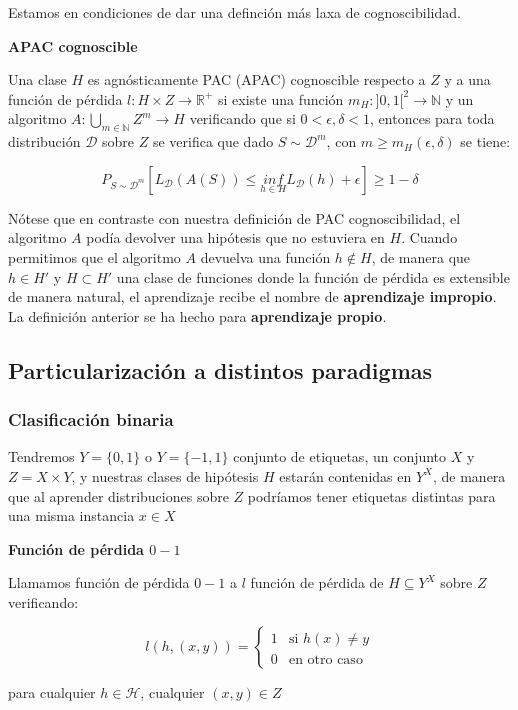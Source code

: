 Estamos en condiciones de dar una definción más laxa de cognoscibilidad.

\begin{definition} \textbf{APAC cognoscible}

Una clase $H$ es agnósticamente PAC (APAC) cognoscible respecto a $Z$ y a una función de pérdida 
$l: H \times Z \rightarrow \mathbb{R}^{+}$ si existe una función 
$m_{H} : ]0,1[^2\rightarrow \mathbb{N}$ y un algoritmo 
$A: \underset{m\in \mathbb{N}}{\bigcup} Z^m \rightarrow H$ verificando que si 
$0 < \epsilon, \delta < 1$, entonces para toda distribución $\mathcal{D}$ sobre $Z$ se verifica
que dado $S\sim \mathcal{D}^m$, con $m\ge m_{H}(\epsilon, \delta)$ se tiene:

\[P_{S\sim \mathcal{D}^m}[L_{\mathcal{D}}(A(S)) \le \underset{h\in H}{inf} L_{\mathcal{D}}(h) + \epsilon] \ge 1-\delta\]
\end{definition}

Nótese que en contraste con nuestra definición de PAC cognoscibilidad, el algoritmo $A$ podía devolver una 
hipótesis que no estuviera en $H$. Cuando permitimos que el algoritmo $A$ devuelva una función 
$h \notin H$, de manera que $h \in H'$ y  $H \subset H'$ una clase de funciones donde la función de pérdida 
es extensible de manera natural, el aprendizaje recibe el nombre de \textbf{aprendizaje impropio}. La definición 
anterior se ha hecho para \textbf{aprendizaje propio}.


\subsection{Particularización a distintos paradigmas}

\subsubsection{Clasificación binaria}

Tendremos $Y=\{0,1\}$ o $Y=\{-1,1\}$ conjunto de etiquetas, un conjunto $X$ y $Z=X\times Y$, y nuestras clases
de hipótesis $H$ estarán contenidas en $Y^X$, de manera que al aprender distribuciones sobre $Z$ podríamos 
tener etiquetas distintas para una misma instancia $x \in X$

\begin{definition} \textbf{Función de pérdida $0-1$}

Llamamos función de pérdida $0-1$ a $l$ función de pérdida de $H\subseteq Y^X$ sobre $Z$ verificando:
 
 \[l(h, (x,y)) = \left\{\begin{array}{ll}
                         1 & \textrm{si } h(x)\neq y\\
                         0 & \textrm{en otro caso}
                        \end{array}\right.\]

para cualquier $h\in \mathcal{H}$, cualquier $(x,y) \in Z$
\end{definition}

